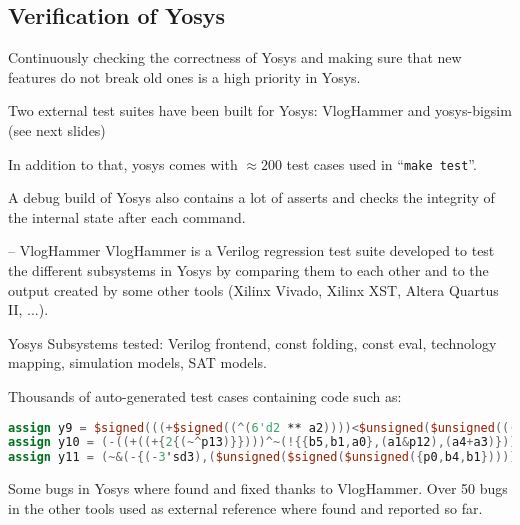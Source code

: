 
\subsection{Verification of Yosys}

\begin{frame}{\subsecname}
Continuously checking the correctness of Yosys and making sure that new features
do not break old ones is a high priority in Yosys.

\bigskip
Two external test suites have been built for Yosys: VlogHammer and yosys-bigsim
(see next slides)

\bigskip
In addition to that, yosys comes with $\approx\!200$ test cases used in ``{\tt make test}''.

\bigskip
A debug build of Yosys also contains a lot of asserts and checks the integrity of
the internal state after each command.
\end{frame}

\begin{frame}[fragile]{\subsecname{} -- VlogHammer}
VlogHammer is a Verilog regression test suite developed to test the different
subsystems in Yosys by comparing them to each other and to the output created
by some other tools (Xilinx Vivado, Xilinx XST, Altera Quartus II, ...).

\bigskip
Yosys Subsystems tested: Verilog frontend, const folding, const eval, technology mapping,
simulation models, SAT models.

\bigskip
Thousands of auto-generated test cases containing code such as:
\begin{lstlisting}[xleftmargin=1cm, basicstyle=\ttfamily\fontsize{8pt}{10pt}\selectfont, language=Verilog]
assign y9 = $signed(((+$signed((^(6'd2 ** a2))))<$unsigned($unsigned(((+a3))))));
assign y10 = (-((+((+{2{(~^p13)}})))^~(!{{b5,b1,a0},(a1&p12),(a4+a3)})));
assign y11 = (~&(-{(-3'sd3),($unsigned($signed($unsigned({p0,b4,b1}))))}));
\end{lstlisting}

\bigskip
Some bugs in Yosys where found and fixed thanks to VlogHammer. Over 50 bugs in
the other tools used as external reference where found and reported so far.
\end{frame}

